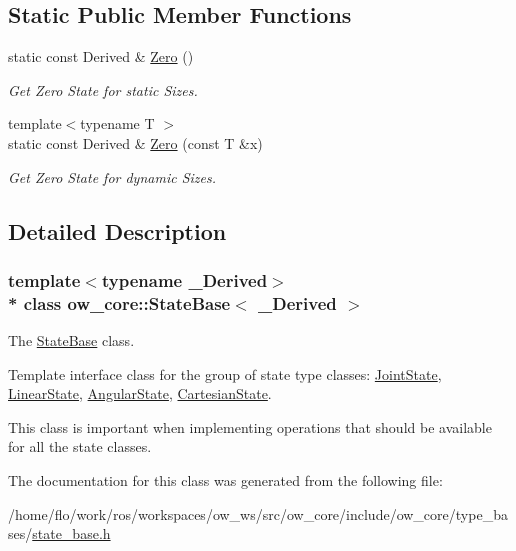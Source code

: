 \subsection*{Static Public Member Functions}
\begin{DoxyCompactItemize}
\item 
static const Derived \& \hyperlink{classow__core_1_1StateBase_a82b3a22c15f7c57ad31a0453fcef7428}{Zero} ()\hypertarget{classow__core_1_1StateBase_a82b3a22c15f7c57ad31a0453fcef7428}{}\label{classow__core_1_1StateBase_a82b3a22c15f7c57ad31a0453fcef7428}

\begin{DoxyCompactList}\small\item\em Get Zero State for static Sizes. \end{DoxyCompactList}\item 
{\footnotesize template$<$typename T $>$ }\\static const Derived \& \hyperlink{classow__core_1_1StateBase_a117c081f40d60cd92eaa9c1311a44f79}{Zero} (const T \&x)\hypertarget{classow__core_1_1StateBase_a117c081f40d60cd92eaa9c1311a44f79}{}\label{classow__core_1_1StateBase_a117c081f40d60cd92eaa9c1311a44f79}

\begin{DoxyCompactList}\small\item\em Get Zero State for dynamic Sizes. \end{DoxyCompactList}\end{DoxyCompactItemize}


\subsection{Detailed Description}
\subsubsection*{template$<$typename \+\_\+\+Derived$>$\\*
class ow\+\_\+core\+::\+State\+Base$<$ \+\_\+\+Derived $>$}

The \hyperlink{classow__core_1_1StateBase}{State\+Base} class. 

Template interface class for the group of state type classes\+: \hyperlink{classow__core_1_1JointState}{Joint\+State}, \hyperlink{classow__core_1_1LinearState}{Linear\+State}, \hyperlink{classow__core_1_1AngularState}{Angular\+State}, \hyperlink{classow__core_1_1CartesianState}{Cartesian\+State}.

This class is important when implementing operations that should be available for all the state classes. 

The documentation for this class was generated from the following file\+:\begin{DoxyCompactItemize}
\item 
/home/flo/work/ros/workspaces/ow\+\_\+ws/src/ow\+\_\+core/include/ow\+\_\+core/type\+\_\+bases/\hyperlink{state__base_8h}{state\+\_\+base.\+h}\end{DoxyCompactItemize}

